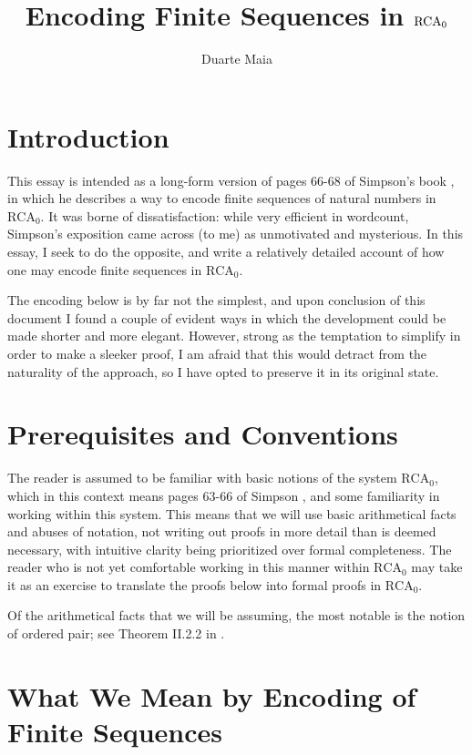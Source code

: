 \documentclass{article}
\title{Encoding Finite Sequences in $\RCA_0$}
\author{Duarte Maia}
\theoremstyle{nonumberplain}
\newcommand{\RCA}{\mathrm{RCA}}
\begin{document}
\maketitle
\tableofcontents

\section{Introduction}

This essay is intended as a long-form version of pages 66-68 of Simpson's book \cite{simpson}, in which he describes a way to encode finite sequences of natural numbers in $\RCA_0$. It was borne of dissatisfaction: while very efficient in wordcount, Simpson's exposition came across (to me) as unmotivated and mysterious. In this essay, I seek to do the opposite, and write a relatively detailed account of how one may encode finite sequences in $\RCA_0$.

The encoding below is by far not the simplest, and upon conclusion of this document I found a couple of evident ways in which the development could be made shorter and more elegant. However, strong as the temptation to simplify in order to make a sleeker proof, I am afraid that this would detract from the naturality of the approach, so I have opted to preserve it in its original state.

\section{Prerequisites and Conventions}

The reader is assumed to be familiar with basic notions of the system $\RCA_0$, which in this context means pages 63-66 of Simpson \cite{simpson}, and some familiarity in working within this system. This means that we will use basic arithmetical facts and abuses of notation, not writing out proofs in more detail than is deemed necessary, with intuitive clarity being prioritized over formal completeness. The reader who is not yet comfortable working in this manner within $\RCA_0$ may take it as an exercise to translate the proofs below into formal proofs in $\RCA_0$.

Of the arithmetical facts that we will be assuming, the most notable is the notion of ordered pair; see Theorem II.2.2 in \cite{simpson}.

\section{What We Mean by Encoding of Finite Sequences}
\end{document}
